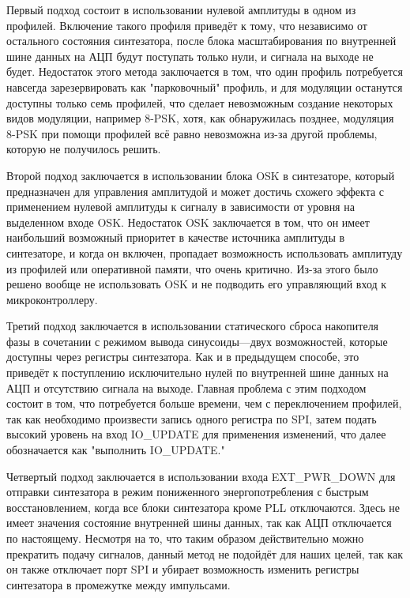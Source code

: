 \documentclass[rusmathsym, eqnumwithinsec, amspack, hyperref]{bomgost}
\begin{document}
Первый подход состоит в использовании нулевой амплитуды в одном из профилей. Включение такого профиля приведёт к тому, что независимо от остального состояния синтезатора, после блока масштабирования по внутренней шине данных на АЦП будут поступать только нули, и сигнала на выходе не будет. Недостаток этого метода заключается в том, что один профиль потребуется навсегда зарезервировать как "парковочный" профиль, и для модуляции останутся доступны только семь профилей, что сделает невозможным создание некоторых видов модуляции, например 8-PSK, хотя, как обнаружилась позднее, модуляция 8-PSK при помощи профилей всё равно невозможна из-за другой проблемы, которую не получилось решить.

Второй подход заключается в использовании блока OSK в синтезаторе, который предназначен для управления амплитудой и может достичь схожего эффекта с применением нулевой амплитуды к сигналу в зависимости от уровня на выделенном входе OSK. Недостаток OSK заключается в том, что он имеет наибольший возможный приоритет в качестве источника амплитуды в синтезаторе, и когда он включен, пропадает возможность использовать амплитуду из профилей или оперативной памяти, что очень критично. Из-за этого было решено вообще не использовать OSK и не подводить его управляющий вход к микроконтроллеру.

Третий подход заключается в использовании статического сброса накопителя фазы в сочетании с режимом вывода синусоиды---двух возможностей, которые доступны через регистры синтезатора. Как и в предыдущем способе, это приведёт к поступлению исключительно нулей по внутренней шине данных на АЦП и отсутствию сигнала на выходе. Главная проблема с этим подходом состоит в том, что потребуется больше времени, чем с переключением профилей, так как необходимо произвести запись одного регистра по SPI, затем подать высокий уровень на вход IO\_UPDATE для применения изменений, что далее обозначается как "выполнить IO\_UPDATE."

Четвертый подход заключается в использовании входа EXT\_PWR\_DOWN для отправки синтезатора в режим пониженного энергопотребления с быстрым восстановлением, когда все блоки синтезатора кроме PLL отключаются. Здесь не имеет значения состояние внутренней шины данных, так как АЦП отключается по настоящему. Несмотря на то, что таким образом действительно можно прекратить подачу сигналов, данный метод не подойдёт для наших целей, так как он также отключает порт SPI и убирает возможность изменить регистры синтезатора в промежутке между импульсами.
\end{document}
